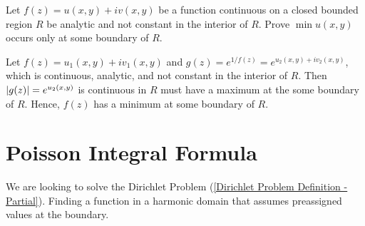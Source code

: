 \documentclass[12pt, english]{book}
\makeatletter
\renewenvironment{proof}[1][\proofname]{\par
	\pushQED{\qed}%
	\normalfont \topsep6\p@\@plus6\p@\relax
	\list{}{%
		\settowidth{\leftmargin}{\itshape\proofname:\hskip\labelsep}%
		\setlength{\labelwidth}{0pt}%
		\setlength{\itemindent}{-\leftmargin}%
		}%
	\item[\hskip\labelsep\itshape#1\@addpunct{:}]\ignorespaces
	}{\popQED\endlist\@endpefalse}
\makeatother
\begin{document}
	\begin{example}
		\label{Max and Min of Harmonic Real-Valued function only occurs at the boundary of closed bounded region Example - Complex}
		Let \(f(z) = u(x,y) + iv(x,y)\) be a function continuous on a closed bounded region \(R\) be analytic and not constant in the interior of \(R\). Prove \(\min u(x,y)\) occurs only at some boundary of \(R\).
		\begin{proof}
			{\color{Grey}
			Let \(f(z) = u_1(x,y) + iv_1(x,y)\) and \(g(z) = e^{1/f(z)} = e^{u_2(x,y) + iv_2(x,y)}\), which is continuous, analytic, and not constant in the interior of \(R\). Then \(\abs{g(z)} = e^{u_2(x,y)}\) is continuous in \(R\) must have a maximum at the some boundary of \(R\). Hence, \(f(z)\) has a minimum at some boundary of \(R\).
			}
		\end{proof}
	\end{example}

	\section{Poisson Integral Formula} \label{Poisson Integral Formula - Complex}
	
	We are looking to solve the Dirichlet Problem (\cref{Dirichlet Problem Definition - Partial}). Finding a function in a harmonic domain  that assumes preassigned values at the boundary.
	
\end{document}
